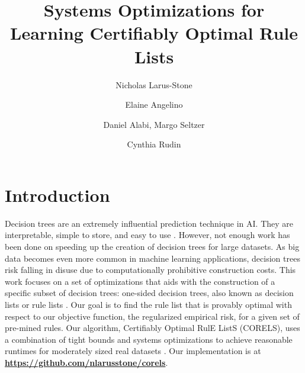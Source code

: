 \documentclass[format=sigconf]{acmart}
\begin{document}
\title{Systems Optimizations for Learning Certifiably Optimal Rule Lists}
\author{Nicholas Larus-Stone}

\author{Elaine Angelino}

\author{Daniel Alabi, Margo Seltzer}

\author{Cynthia Rudin}

\setlength{\abovedisplayskip}{3pt}
\setlength{\belowdisplayskip}{-10pt}
\setlength{\textfloatsep}{8pt}

\maketitle

\section{Introduction}
Decision trees are an extremely influential prediction technique in AI.
They are interpretable, simple to store, and easy to use \cite{BreimanFrOlSt84}.
However, not enough work has been done on speeding up the creation of decision trees for large datasets.
As big data becomes even more common in machine learning applications, decision trees risk falling in disuse due to computationally prohibitive construction costs.
This work focuses on a set of optimizations that aids with the construction of a specific subset of decision trees: one-sided decision trees, also known as decision lists or rule lists \cite{Rivest87}.
Our goal is to find the rule list that is provably optimal with respect to our objective function, the regularized empirical risk, for a given set of pre-mined rules.
Our algorithm, Certifiably Optimal RulE ListS (CORELS), uses a combination of tight bounds and systems optimizations to achieve reasonable runtimes for moderately sized real datasets \citep{AngelinoLaAlSeRu17-kdd, AngelinoLaAlSeRu17}. Our implementation is at \textbf{\url{https://github.com/nlarusstone/corels}}.
\end{document}
